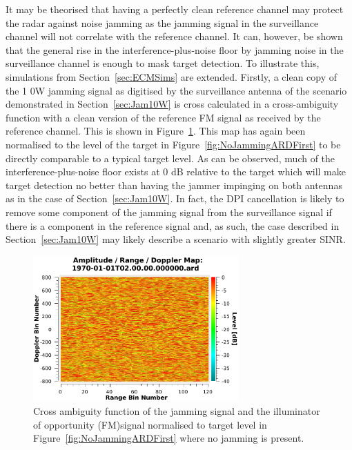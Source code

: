 \documentclass[english, 12pt]{report}
\begin{document}
It may be theorised that having a perfectly clean reference channel may protect the radar against noise jamming as the jamming signal in the surveillance channel will not correlate with the reference channel. It can, however, be shown that the general rise in the interference-plus-noise floor by jamming noise in the surveillance channel is enough to mask target detection. To illustrate this, simulations from Section~\ref{sec:ECMSims} are extended. Firstly, a clean copy of the 1 0W jamming signal as digitised by the surveillance antenna of the scenario demonstrated in Section~\ref{sec:Jam10W} is cross calculated in a cross-ambiguity function with a clean version of the reference FM signal as received by the reference channel. This is shown in Figure~\ref{fig:FMJamCAF}. This map has again been normalised to the level of the target in Figure~\ref{fig:NoJammingARDFirst} to be directly comparable to a typical target level. As can be observed, much of the interference-plus-noise floor exists at 0 dB relative to the target which will make target detection no better than having the jammer impinging on both antennas as in the case of Section~\ref{sec:Jam10W}. In fact, the DPI cancellation is likely to remove some component of the jamming signal from the surveillance signal if there is a component in the reference signal and, as such, the case described in Section~\ref{sec:Jam10W} may likely describe a scenario with slightly greater SINR.

\begin{figure}[htbp]
\begin{center}
\includegraphics[width=0.7\textwidth]{figs/Simulations/FMJamCAF.pdf}
\caption[Cross ambiguity of jammer and signal]{Cross ambiguity function of the jamming signal and the illuminator of opportunity (FM)signal normalised to target level in Figure~\ref{fig:NoJammingARDFirst} where no jamming is present.}
\label{fig:FMJamCAF}
\end{center}
\end{figure}
\end{document}
